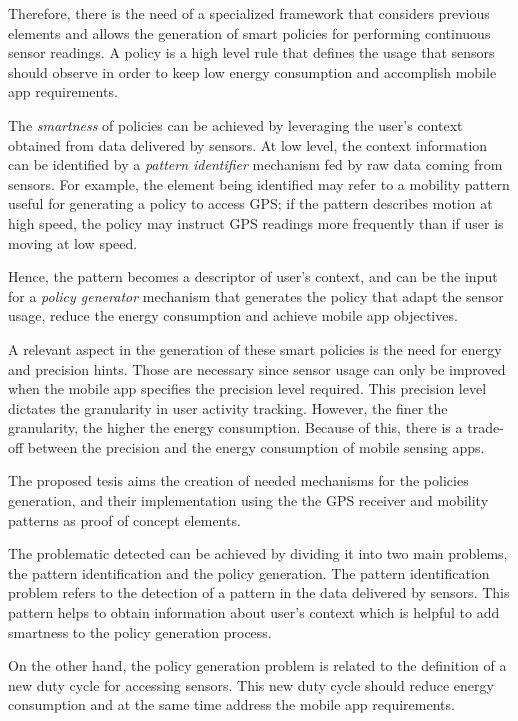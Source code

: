 Therefore, there is the need of a specialized framework that considers previous elements and allows the generation of smart policies for performing continuous sensor readings.
A policy is a high level rule that defines the usage that sensors should observe in order to keep low energy consumption and accomplish mobile app requirements.


The \emph{smartness} of policies can be achieved by leveraging the user’s context obtained from data delivered by sensors.
At low level, the context information can be identified by a \emph{pattern identifier} mechanism fed by raw data coming from sensors.
For example, the element being identified may refer to a mobility pattern useful for generating a policy to access GPS; if the pattern describes motion at high speed, the policy may instruct GPS readings more frequently than if user is moving at low speed.



Hence, the pattern becomes a descriptor of user's context, and can be the input for a \emph{policy generator} mechanism that generates the policy that adapt the sensor usage, reduce the energy consumption and achieve mobile app objectives.


A relevant aspect in the generation of these smart policies is the need for energy and precision hints.
Those are necessary since sensor usage can only be improved when the mobile app specifies the precision level required.
This precision level dictates the granularity in user activity tracking.
However, the finer the granularity, the higher the energy consumption. 
Because of this, there is a trade-off between the precision and the energy consumption of mobile sensing apps.


The proposed tesis aims the creation of needed mechanisms for the policies generation, and their implementation using the the GPS receiver and mobility patterns as proof of concept elements.


The problematic detected can be achieved by dividing it into two main problems, the pattern identification and the policy generation.
The pattern identification problem refers to the detection of a pattern in the data delivered by sensors.
This pattern helps to obtain information about user's context which is helpful to add smartness to the policy generation process.

On the other hand, the policy generation problem is related to the definition of a new duty cycle for accessing sensors.
This new duty cycle should reduce energy consumption and at the same time address the mobile app requirements.
